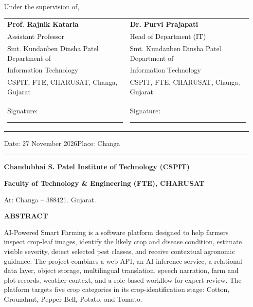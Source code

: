 \documentclass[12pt,a4paper,oneside,openany]{report}
\begin{document}
\vspace{0.30cm}
Under the supervision of,\par
\vspace{0.18cm}
\noindent\begin{tabularx}{\textwidth}{@{}Y Y@{}}
\textbf{Prof. Rajnik Kataria} & \textbf{Dr. Purvi Prajapati}\\
Assistant Professor & Head of Department (IT)\\
Smt. Kundanben Dinsha Patel Department of & Smt. Kundanben Dinsha Patel Department of\\
Information Technology & Information Technology\\
CSPIT, FTE, CHARUSAT, Changa, Gujarat & CSPIT, FTE, CHARUSAT, Changa, Gujarat\\[0.35cm]
Signature: \rule{4.0cm}{0.4pt} & Signature: \rule{4.0cm}{0.4pt}
\end{tabularx}
\vspace{0.35cm}
\noindent Date: 27 November 2026\hfill Place: Changa
\vfill
\begin{center}
\rule{\textwidth}{1.2pt}\par\vspace{0.10cm}
{\bfseries Chandubhai S. Patel Institute of Technology (CSPIT)}\par
{\bfseries Faculty of Technology \& Engineering (FTE), CHARUSAT}\par
At: Changa -- 388421. Gujarat.
\end{center}
\ClearShipoutPictureBG

\clearpage
{}
{}
\begin{center}
{\bfseries\large ABSTRACT}
\end{center}
\vspace{0.25cm}
AI-Powered Smart Farming is a software platform designed to help farmers inspect crop-leaf images, identify the likely crop and disease condition, estimate visible severity, detect selected pest classes, and receive contextual agronomic guidance. The project combines a web API, an AI inference service, a relational data layer, object storage, multilingual translation, speech narration, farm and plot records, weather context, and a role-based workflow for expert review. The platform targets five crop categories in its crop-identification stage: Cotton, Groundnut, Pepper Bell, Potato, and Tomato.
\end{document}
